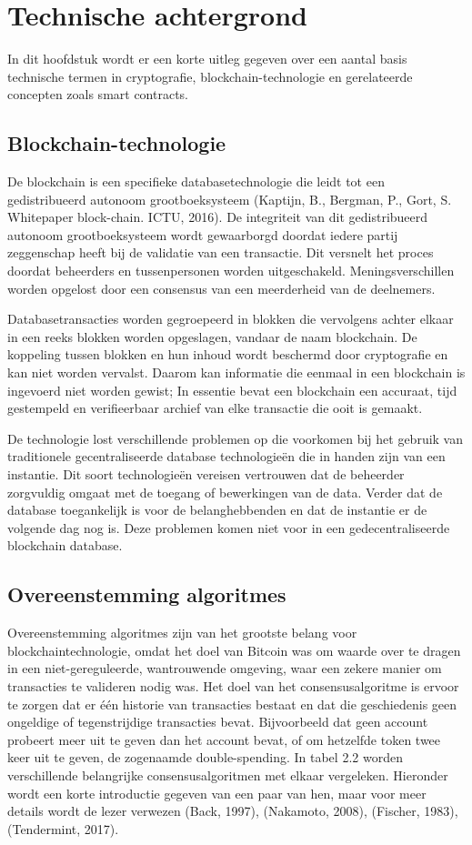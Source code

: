 \chapter{Technische achtergrond}\label{chap:q1}
In dit hoofdstuk wordt er een korte uitleg gegeven over een aantal basis technische termen in cryptografie, blockchain-technologie en gerelateerde concepten zoals smart contracts.

\section{Blockchain-technologie}
De blockchain is een specifieke databasetechnologie die leidt tot een gedistribueerd autonoom grootboeksysteem (Kaptijn, B., Bergman, P., Gort, S. Whitepaper block-chain. ICTU, 2016). De integriteit van dit gedistribueerd autonoom grootboeksysteem wordt gewaarborgd doordat iedere partij zeggenschap heeft bij de validatie van een transactie. Dit versnelt het proces doordat beheerders en tussenpersonen worden uitgeschakeld. Meningsverschillen worden opgelost door een consensus van een meerderheid van de deelnemers.
\par
Databasetransacties worden gegroepeerd in blokken die vervolgens achter elkaar in een reeks blokken worden opgeslagen, vandaar de naam blockchain. De koppeling tussen blokken en hun inhoud wordt beschermd door cryptografie en kan niet worden vervalst. Daarom kan informatie die eenmaal in een blockchain is ingevoerd niet worden gewist; In essentie bevat een blockchain een accuraat, tijd gestempeld en verifieerbaar archief van elke transactie die ooit is gemaakt.
\par
De technologie lost verschillende problemen op die voorkomen bij het gebruik van traditionele gecentraliseerde database technologieën die in handen zijn van een instantie. Dit soort technologieën vereisen vertrouwen dat de beheerder zorgvuldig omgaat met de toegang of bewerkingen van de data. Verder dat de database toegankelijk is voor de belanghebbenden en dat de instantie er de volgende dag nog is. Deze problemen komen niet voor in een gedecentraliseerde blockchain database.

\section{Overeenstemming algoritmes}
Overeenstemming algoritmes zijn van het grootste belang voor blockchaintechnologie, omdat het doel van Bitcoin was om waarde over te dragen in een niet-gereguleerde, wantrouwende omgeving, waar een zekere manier om transacties te valideren nodig was. Het doel van het consensusalgoritme is ervoor te zorgen dat er één historie van transacties bestaat en dat die geschiedenis geen ongeldige of tegenstrijdige transacties bevat. Bijvoorbeeld dat geen account probeert meer uit te geven dan het account bevat, of om hetzelfde token twee keer uit te geven, de zogenaamde double-spending. In tabel 2.2 worden verschillende belangrijke consensusalgoritmen met elkaar vergeleken. Hieronder wordt een korte introductie gegeven van een paar van hen, maar voor meer details wordt de lezer verwezen (Back, 1997), (Nakamoto, 2008), (Fischer, 1983), (Tendermint, 2017).


